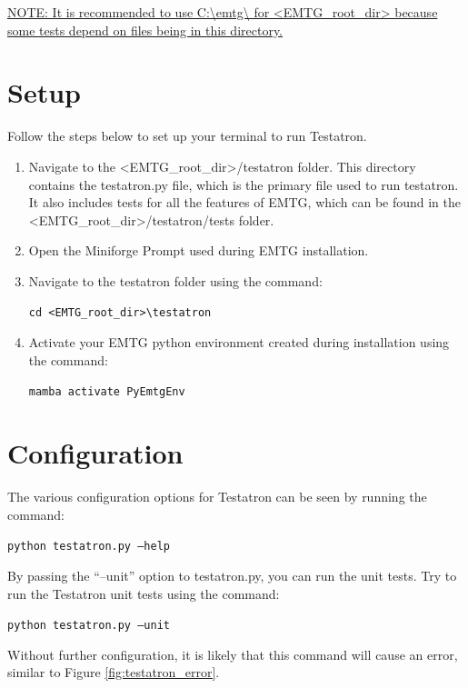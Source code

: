 \documentclass[11pt]{article}
\makeatletter
\newcommand{\knownissuelabel}[2]
{
	 \phantomsection
  	\hyperref[#2_h]{#1}\def\@currentlabel{\unexpanded{#1}}\label{#2_b}
}
\makeatother
\begin{document}
\noindent\knownissuelabel{NOTE: It is recommended to use C:\textbackslash emtg\textbackslash{} for \textless EMTG\_root\_dir\textgreater{} because some tests depend on files being in this directory.}{tests_require_specific_dir}

\section{Setup}
\label{sec:setup}

Follow the steps below to set up your terminal to run Testatron.

\begin{enumerate}
\item Navigate to the \textless EMTG\_root\_dir\textgreater /testatron folder. This directory contains the testatron.py file, which is the primary file used to run testatron. It also includes tests for all the features of \ac{EMTG}, which can be found in the \textless EMTG\_root\_dir\textgreater /testatron/tests folder. 
\item Open the Miniforge Prompt used during \ac{EMTG} installation. 
\item Navigate to the testatron folder using the command:

\texttt{cd <EMTG\_root\_dir>\textbackslash testatron}
\item Activate your \ac{EMTG} python environment created during installation using the command: 

\texttt{mamba activate PyEmtgEnv}
\end{enumerate}

\section{Configuration}
\label{sec:configuration}

The various configuration options for Testatron can be seen by running the command: 

\texttt{python testatron.py --help}

\noindent By passing the ``--unit'' option to testatron.py, you can run the unit tests. Try to run the Testatron unit tests using the command:

\texttt{python testatron.py --unit}

\noindent Without further configuration, it is likely that this command will cause an error, similar to Figure \ref{fig:testatron_error}. 
\end{document}
